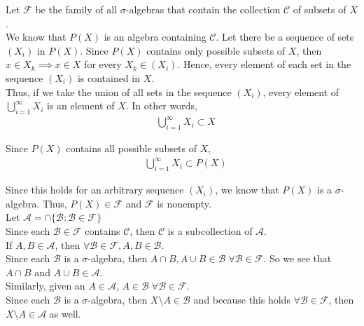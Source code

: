 \documentclass[12pt]{article}
\newenvironment{problem}[2][Problem]{\begin{trivlist}
\item[\hskip \labelsep {\bfseries #1}\hskip \labelsep {\bfseries #2.}]}{\end{trivlist}}
\begin{document}
\newpage
\begin{problem}{3}
\end{problem}

Let $\mathscr{F}$ be the family of all $\sigma$-algebras that contain the collection $\mathscr{C}$ of subsets of $X$.\\

We know that $P(X)$ is an algebra containing $\mathscr{C}$. Let there be a sequence of sets $(X_i)$ in $P(X)$. Since $P(X)$ contains only possible subsets of $X$, then $x \in X_k \implies x \in X$ for every $X_k \in (X_i)$. Hence, every element of each set in the sequence $(X_i)$ is contained in $X$.\\

Thus, if we take the union of all sets in the sequence $(X_i)$, every element of $\bigcup\limits_{i=1}^{\infty} X_{i}$ is an element of $X$. In other words, 
\begin{align*}
&\bigcup\limits_{i=1}^{\infty} X_{i} \subset X
\end{align*}

Since $P(X)$ contains all possible subsets of $X$, 
\begin{align*}
&\bigcup\limits_{i=1}^{\infty} X_{i} \subset P(X)
\end{align*}

Since this holds for an arbitrary sequence $(X_i)$, we know that $P(X)$ is a $\sigma$-algebra. Thus, $P(X) \in \mathscr{F}$ and $\mathscr{F}$ is nonempty.\\

Let $\mathscr{A} = \cap \{\mathscr{B} : \mathscr{B} \in \mathscr{F}\}$\\

Since each $\mathscr{B} \in \mathscr{F}$ contains $\mathscr{C}$, then $\mathscr{C}$ is a subcollection of $\mathscr{A}$.\\

If $A, B \in \mathscr{A}$, then $\forall \mathscr{B} \in \mathscr{F}, A, B \in \mathscr{B}$.\\

Since each $\mathscr{B}$ is a $\sigma$-algebra, then $A \cap B, A \cup B \in \mathscr{B} \; \forall \mathscr{B} \in \mathscr{F}$. So we see that $A \cap B$ and $A \cup B \in \mathscr{A}$.\\

Similarly, given an $A \in \mathscr{A}$, $A \in \mathscr{B} \; \forall \mathscr{B} \in \mathscr{F}$.\\

Since each $\mathscr{B}$ is a $\sigma$-algebra, then $X \setminus A \in \mathscr{B}$ and because this holds $\forall \mathscr{B} \in \mathscr{F}$, then $X \setminus A \in \mathscr{A}$ as well.\\
\end{document}
